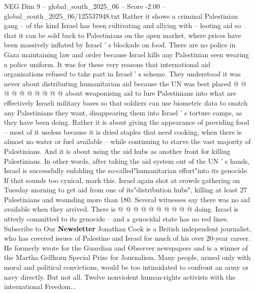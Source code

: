 \begin{textsample}{NEG Dim 9 – global\_south\_2025\_06 – Score -2.00 – global\_south\_2025\_06/125537948.txt}
Rather it shows a criminal Palestinian gang -- of the kind Israel has been cultivating and allying with -- looting aid so that it can be sold back to Palestinians on the open market, where prices have been massively inflated by Israel ' s blockade on food.
There are no police in Gaza maintaining law and order because Israel kills any Palestinian seen wearing a police uniform.
It was for these very reasons that international aid organisations refused to take part in Israel ' s scheme.
They understood it was never about distributing humanitarian aid because the UN was best placed @ @ @ @ @ @ @ @ @ @ about weaponising aid to lure Palestinians into what are effectively Israeli military bases so that soldiers can use biometric data to snatch any Palestinians they want, disappearing them into Israel ' s torture camps, as they have been doing.
Rather it is about giving the appearance of providing food -- most of it useless because it is dried staples that need cooking, when there is almost no water or fuel available -- while continuing to starve the vast majority of Palestinians.
And it is about using the aid hubs as another front for killing Palestinians.
In other words, after taking the aid system out of the UN ' s hands, Israel is successfully enfolding the so-called"humanitarian effort"into its genocide.
If that sounds too cynical, mark this.
Israel again shot at crowds gathering on Tuesday morning to get aid from one of its"distribution hubs", killing at least 27 Palestinians and wounding more than 180.
Several witnesses say there was no aid available when they arrived.
There is @ @ @ @ @ @ @ @ @ @ doing.
Israel is utterly committed to its genocide -- and a genocidal state has no red lines.
Subscribe to Our \textbf{Newsletter} Jonathan Cook is a British independent journalist, who has covered issues of Palestine and Israel for much of his over 20-year career.
He formerly wrote for the Guardian and Observer newspapers and is a winner of the Martha Gellhorn Special Prize for Journalism.
Many people, armed only with moral and political convictions, would be too intimidated to confront an army or navy directly.
But not all.
Twelve nonviolent human-rights activists with the international Freedom...

\end{textsample}
